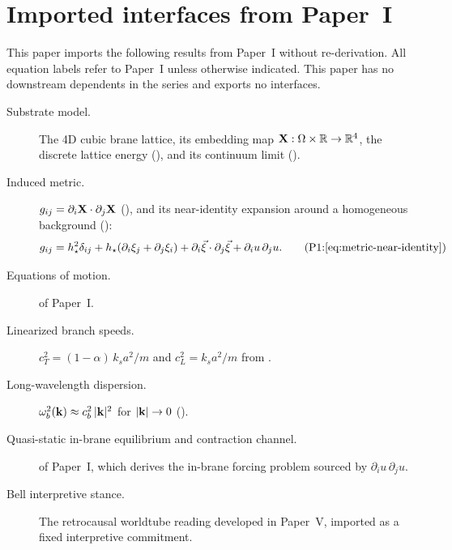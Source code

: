 \section{Imported interfaces from Paper~I}
\label{sec:interfaces}

This paper imports the following results from Paper~I without re-derivation.
All equation labels refer to Paper~I unless otherwise indicated.
This paper has no downstream dependents in the series and exports no interfaces.

\begin{description}
  \item[\normalfont Substrate model.]
  The 4D cubic brane lattice, its embedding map $\mathbf{X}:\Omega\times\mathbb{R}\to\mathbb{R}^4$, the discrete
  lattice energy (), and its continuum limit ().

  \item[\normalfont Induced metric.]
  $g_{ij} = \partial_i\mathbf{X}\cdot\partial_j\mathbf{X}$ (), and its
  near-identity expansion around a homogeneous background ():
  \begin{equation}
    g_{ij} = h_\star^2\delta_{ij}
    + h_\star(\partial_i\xi_j+\partial_j\xi_i)
    + \partial_i\vec\xi\cdot\partial_j\vec\xi
    + \partial_i u\,\partial_j u.
    \tag{P1:\ref{eq:metric-near-identity}}
  \end{equation}

  \item[\normalfont Equations of motion.]
   of Paper~I.

  \item[\normalfont Linearized branch speeds.]
  $c_T^2=(1-\alpha)\,k_s a^2/m$ and $c_L^2=k_s a^2/m$ from .

  \item[\normalfont Long-wavelength dispersion.]
  $\omega_b^2(\mathbf{k})\approx c_b^2\,|\mathbf{k}|^2$ for $|\mathbf{k}|\to 0$ ().

  \item[\normalfont Quasi-static in-brane equilibrium and contraction channel.]
   of Paper~I, which derives the in-brane forcing problem sourced
  by $\partial_i u\,\partial_j u$.

  \item[\normalfont Bell interpretive stance.]
  The retrocausal worldtube reading developed in Paper~V, imported as
  a fixed interpretive commitment.
\end{description}